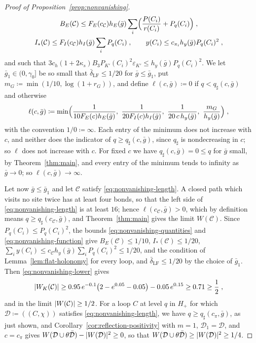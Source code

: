 \documentclass[11pt]{preprint}
\DeclarePairedDelimiter{\abs}{\lvert}{\rvert}
\numberwithin{equation}{section}
\theoremstyle{definition}
\theoremstyle{remark}
\theoremstyle{plain}
\begin{document}
\begin{proof}[Proof of Proposition~\ref{prop:nonvanishing}]
\begin{equation}
\begin{gathered}
    B_E(\mathcal C) \leq F_E(c_{\mathcal C})h_E(\bar g)\sum_i\Bigl(\frac{P(C_i)}{r(C_i)} + P_q(C_i)\Bigr)\;,\\
    I_*(\mathcal C) \leq F_I(c_{\mathcal C})h_I(\bar g)\sum_iP_q(C_i)\;,
    \qquad
    y(C_i) \leq c_{\pi_i}h_y(\bar g)P_q(C_i)^2\;,
\end{gathered}
\end{equation}
and such that $3c_h(1 + 2\kappa_s)B_3P_{K'}(C_i)^2\varepsilon_{K'} \leq h_y(\bar g)P_q(C_i)^2$. We let $\bar g_1 \in (0, \gamma_0]$ be so small that $\bar\delta_{\mathrm{LF}} \leq 1/20$ for $\bar g \leq \bar g_1$, put $m_G \coloneqq \min(1/10, \log(1 + r_G))$, and define $\ell(c, \bar g) \coloneqq 0$ if $q < q_\sharp(c, \bar g)$ and otherwise
\begin{equation}\label{eq:nonvanishing-function}
    \ell(c, \bar g) \coloneqq \min\Bigl(\frac{1}{10F_E(c)h_E(\bar g)},\ \frac{1}{20F_I(c)h_I(\bar g)},\ \frac{1}{20\,c\,h_y(\bar g)},\ \frac{m_G}{h_y(\bar g)}\Bigr)\;,
\end{equation}
with the convention $1/0 \coloneqq \infty$. Each entry of the minimum does not increase with $c$, and neither does the indicator of $q \geq q_\sharp(c, \bar g)$, since $q_\sharp$ is nondecreasing in $c$; so $\ell$ does not increase with $c$. For fixed $c$ we have $q_\sharp(c, \bar g) = 0 \leq q$ for $\bar g$ small, by Theorem~\ref{thm:main}, and every entry of the minimum tends to infinity as $\bar g \to 0$; so $\ell(c, \bar g) \to \infty$.

Let now $\bar g \leq \bar g_1$ and let $\mathcal C$ satisfy \eqref{eq:nonvanishing-length}. A closed path which visits no site twice has at least four bonds, so that the left side of \eqref{eq:nonvanishing-length} is at least $16$; hence $\ell(c_{\mathcal C}, \bar g) > 0$, which by definition means $q \geq q_\sharp(c_{\mathcal C}, \bar g)$, and Theorem~\ref{thm:main} gives the limit $W(\mathcal C)$. Since $P_q(C_i) \leq P_q(C_i)^2$, the bounds \eqref{eq:nonvanishing-quantities} and \eqref{eq:nonvanishing-function} give $B_E(\mathcal C) \leq 1/10$, $I_*(\mathcal C) \leq 1/20$, $\sum_iy(C_i) \leq c_{\mathcal C}h_y(\bar g)\sum_iP_q(C_i)^2 \leq 1/20$, and the condition of Lemma~\ref{lem:flat-holonomy} for every loop, and $\bar\delta_{\mathrm{LF}} \leq 1/20$ by the choice of $\bar g_1$. Then \eqref{eq:nonvanishing-lower} gives
\begin{equation}\label{eq:nonvanishing-number}
    \abs{W_K(\mathcal C)} \geq 0.95\,e^{-0.1}\bigl(2 - e^{0.05} - 0.05\bigr) - 0.05\,e^{0.15} \geq 0.71 \geq \frac12\;,
\end{equation}
and in the limit $\abs{W(\mathcal C)} \geq 1/2$. For a loop $C$ at level $q$ in $H_+$ for which $\mathcal D \coloneqq ((C, \chi))$ satisfies \eqref{eq:nonvanishing-length}, we have $q \geq q_\sharp(c_\pi, \bar g)$, as just shown, and Corollary~\ref{cor:reflection-positivity} with $m = 1$, $\mathcal D_1 = \mathcal D$, and $c = c_\pi$ gives $W(\mathcal D \cup \theta\bar{\mathcal D}) - \abs{W(\mathcal D)}^2 \geq 0$, so that $W(\mathcal D \cup \theta\bar{\mathcal D}) \geq \abs{W(\mathcal D)}^2 \geq 1/4$.
\end{proof}
\end{document}
